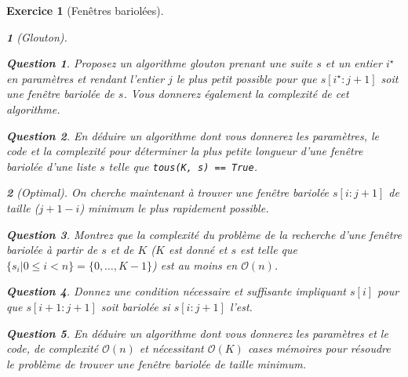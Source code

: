 \documentclass{article}
\theoremstyle{exostyle}
\newtheorem{exo}{Exercice}
\theoremstyle{partiestyle}
\newtheorem{partie}{}[exo]
\theoremstyle{questionstyle}
\newtheorem{questionpartie}{Question}[partie]
\begin{document}
\begin{exo}[Fenêtres bariolées]
\begin{partie}[Glouton]
\begin{questionpartie}
Proposez un algorithme glouton prenant une suite $s$ et un entier $i^\star$ en paramètres et rendant l'entier $j$ le plus petit possible pour que  $s[i^\star:j+1]$ soit une fenêtre bariolée de $s$. Vous donnerez également la complexité de cet algorithme.

\end{questionpartie}
\begin{questionpartie}
En déduire un algorithme dont vous donnerez les paramètres, le code et la complexité pour déterminer la plus petite longueur d’une fenêtre bariolée d'une liste $s$ telle que \verb`tous(K, s) == True`.
\end{questionpartie}

\end{partie}

\begin{partie}[Optimal]

On cherche maintenant à trouver une fenêtre bariolée $s[i:j+1]$ de taille ($j+1-i$) minimum le plus rapidement possible.
\begin{questionpartie}
Montrez que la complexité du problème de la recherche d'une fenêtre bariolée à partir de $s$ et de $K$ ($K$ est donné et $s$ est telle que  $\{s_i \vert 0\leq i < n \} = \{0, \dots, K-1\}$) est au moins en $\mathcal{O}(n)$.
\end{questionpartie}

\begin{questionpartie}
Donnez une condition nécessaire et suffisante impliquant $s[i]$ pour que $s[i+1:j+1]$ soit bariolée si $s[i:j+1]$ l'est.
\end{questionpartie}

\begin{questionpartie}
En déduire un algorithme dont vous donnerez les paramètres et le code, de complexité $\mathcal{O}(n)$ et nécessitant $\mathcal{O}(K)$ cases mémoires pour résoudre le problème de trouver une fenêtre bariolée de taille minimum.
\end{questionpartie}

\end{partie}
\end{exo}
\end{document}
